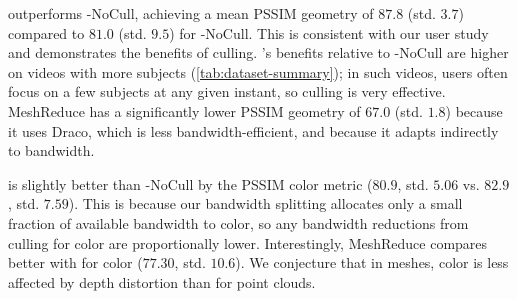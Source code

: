 \livo outperforms \livo-NoCull, achieving a mean PSSIM geometry of $87.8$ (std. $3.7$) compared to $81.0$ (std. $9.5$) for \livo{}-NoCull.
%
This is consistent with our user study and demonstrates the benefits of culling.
%
\livo's benefits relative to \livo-NoCull are higher on videos with more subjects (\cref{tab:dataset-summary}); in such videos, users often focus on a few subjects at any given instant, so culling is very effective.
%
MeshReduce has a significantly lower PSSIM geometry of $67.0$ (std. $1.8$) because it uses Draco, which is less bandwidth-efficient, and because it adapts indirectly to bandwidth.

\livo{} is slightly better than \livo{}-NoCull by the PSSIM color metric ($80.9$, std. $5.06$ vs. $82.9$, std. $7.59$).
%
This is because our bandwidth splitting allocates only a small fraction of available bandwidth to color, so any bandwidth reductions from culling for color are proportionally lower.
%
Interestingly, MeshReduce compares better with \livo{} for color ($77.30$, std. $10.6$).
%
We conjecture that in meshes, color is less affected by depth distortion than for point clouds.

%
%
%

%

